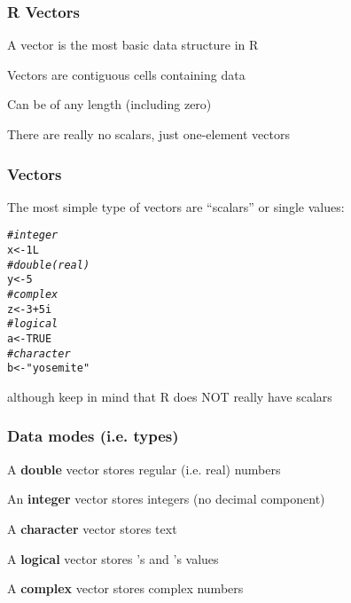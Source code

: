 \documentclass[12pt]{beamer}\usepackage[]{graphicx}\usepackage[]{color}
\makeatletter
\newcommand{\hlnum}[1]{\textcolor[rgb]{0.686,0.059,0.569}{#1}}%
\newcommand{\hlstr}[1]{\textcolor[rgb]{0.192,0.494,0.8}{#1}}%
\newcommand{\hlcom}[1]{\textcolor[rgb]{0.678,0.584,0.686}{\textit{#1}}}%
\newcommand{\hlopt}[1]{\textcolor[rgb]{0,0,0}{#1}}%
\newcommand{\hlstd}[1]{\textcolor[rgb]{0.345,0.345,0.345}{#1}}%
\newcommand{\hlkwb}[1]{\textcolor[rgb]{0.69,0.353,0.396}{#1}}%
\newenvironment{kframe}{%
 \def\at@end@of@kframe{}%
 \ifinner\ifhmode%
  \def\at@end@of@kframe{\end{minipage}}%
  \begin{minipage}{\columnwidth}%
 \fi\fi%
 \def\FrameCommand##1{\hskip\@totalleftmargin \hskip-\fboxsep
 \colorbox{shadecolor}{##1}\hskip-\fboxsep
     \hskip-\linewidth \hskip-\@totalleftmargin \hskip\columnwidth}%
 \MakeFramed {\advance\hsize-\width
   \@totalleftmargin\z@ \linewidth\hsize
   \@setminipage}}%
 {\par\unskip\endMakeFramed%
 \at@end@of@kframe}
\newenvironment{knitrout}{}{} %
\makeatother
\begin{document}

\begin{frame}
\begin{center}
\Huge{}
\end{center}
\end{frame}


\begin{frame}
\frametitle{R Vectors}

\bbi
  \item A vector is the most basic data structure in R
  \item Vectors are contiguous cells containing data
  \item Can be of any length (including zero)
  \item There are really no scalars, just one-element vectors
\ei

\end{frame}


\begin{frame}[fragile]
\frametitle{Vectors}

The most simple type of vectors are ``scalars'' or single values:
\begin{knitrout}\footnotesize
{}\color{fgcolor}\begin{kframe}
\begin{alltt}
\hlcom{# integer}
\hlstd{x} \hlkwb{<-} \hlnum{1L}
\hlcom{# double (real)}
\hlstd{y} \hlkwb{<-} \hlnum{5}
\hlcom{# complex}
\hlstd{z} \hlkwb{<-} \hlnum{3} \hlopt{+} \hlnum{5i}
\hlcom{# logical}
\hlstd{a} \hlkwb{<-} \hlnum{TRUE}
\hlcom{# character}
\hlstd{b} \hlkwb{<-} \hlstr{"yosemite"}
\end{alltt}
\end{kframe}
\end{knitrout}

{\lolit although keep in mind that R does NOT really have scalars}

\end{frame}


\begin{frame}
\frametitle{Data modes (i.e. types)}

\bbi
  \item A \textbf{double} vector stores regular (i.e. real) numbers
  \item An \textbf{integer} vector stores integers (no decimal component)
  \item A \textbf{character} vector stores text
  \item A \textbf{logical} vector stores 's and 's values
  \item A \textbf{complex} vector stores complex numbers
\ei

\end{frame}
\end{document}
